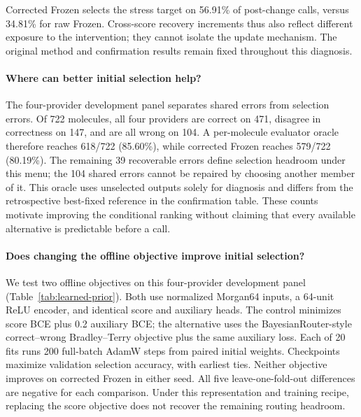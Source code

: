 \documentclass[sigconf,anonymous]{aamas}
\begin{document}
Corrected Frozen selects the stress target on 56.91\% of post-change calls, versus 34.81\% for raw Frozen. Cross-score recovery increments thus also reflect different exposure to the intervention; they cannot isolate the update mechanism. The original method and confirmation results remain fixed throughout this diagnosis.


\paragraph{Where can better initial selection help?}
The four-provider development panel separates shared errors from selection errors. Of 722 molecules, all four providers are correct on 471, disagree in correctness on 147, and are all wrong on 104. A per-molecule evaluator oracle therefore reaches 618/722 (85.60\%), while corrected Frozen reaches 579/722 (80.19\%). The remaining 39 recoverable errors define selection headroom under this menu; the 104 shared errors cannot be repaired by choosing another member of it. This oracle uses unselected outputs solely for diagnosis and differs from the retrospective best-fixed reference in the confirmation table. These counts motivate improving the conditional ranking without claiming that every available alternative is predictable before a call.

\paragraph{Does changing the offline objective improve initial selection?}
We test two offline objectives on this four-provider development panel (Table~\ref{tab:learned-prior}). Both use normalized Morgan64 inputs, a 64-unit ReLU encoder, and identical score and auxiliary heads. The control minimizes score BCE plus 0.2 auxiliary BCE; the alternative uses the BayesianRouter-style correct--wrong Bradley--Terry objective plus the same auxiliary loss. Each of 20 fits runs 200 full-batch AdamW steps from paired initial weights. Checkpoints maximize validation selection accuracy, with earliest ties. Neither objective improves on corrected Frozen in either seed. All five leave-one-fold-out differences are negative for each comparison. Under this representation and training recipe, replacing the score objective does not recover the remaining routing headroom.
\end{document}
